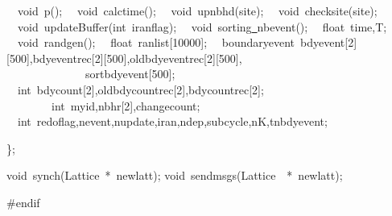 {\ \ void\ p();
\ \ void\ calctime();
\ \ void\ upnbhd(site);
\ \ void\ checksite(site);
\ \ void\ updateBuffer(int\ iranflag);
\ \ void\ sorting\underline\ nbevent();
\ \ float\ time,T;
\ \ void\ randgen();
\ \ float\ ranlist[10000];
\ \ boundaryevent\ bdyevent[2][500],bdyeventrec[2][500],oldbdyeventrec[2][500],
\ \ \ \ \ \ \ \ \ \ \ \ \ \ sortbdyevent[500];
\ \ int\ bdycount[2],oldbdycountrec[2],bdycountrec[2];
\ \ \ \ \ \ \ \ int\ myid,nbhr[2],changecount;
\ \ int\ redoflag,nevent,nupdate,iran,ndep,subcycle,nK,tnbdyevent;

\};

void\ synch(Lattice\ *\ newlatt);
void\ sendmsgs(Lattice\ \ *\ newlatt);

\#endif

 }
\normalfont\normalsize


